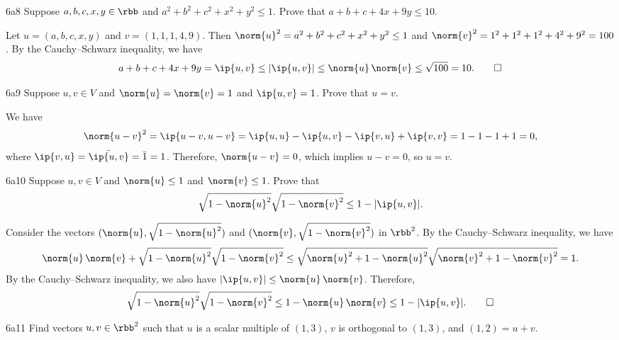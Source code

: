 \begin{exercise}{6a8}
    Suppose $a, b, c, x, y \in \rbb$ and $a^2 + b^2 + c^2 + x^2 + y^2 \leq 1$.
    Prove that $a + b + c + 4x + 9y \leq 10$.
\end{exercise}

\begin{sol}
    Let $u = (a, b, c, x, y)$ and $v = (1, 1, 1, 4, 9)$.
    Then $\norm{u}^2 = a^2 + b^2 + c^2 + x^2 + y^2 \leq 1$ and $\norm{v}^2 = 1^2 + 1^2 + 1^2 + 4^2 + 9^2 = 100$.
    By the Cauchy--Schwarz inequality, we have
    \[
        a + b + c + 4x + 9y = \ip{u, v} \leq |\ip{u, v}| \leq \norm{u}\,\norm{v} \leq \sqrt{100} = 10. \qedhere
    \]
\end{sol}

\begin{exercise}{6a9}
    Suppose $u, v \in V$ and $\norm{u} = \norm{v} = 1$ and $\ip{u, v} = 1$.
    Prove that $u = v$.
\end{exercise}

\begin{sol}
    We have
    \[
        \norm{u - v}^2 = \ip{u - v, u - v} = \ip{u, u} - \ip{u, v} - \ip{v, u} + \ip{v, v} = 1 - 1 - 1 + 1 = 0,
    \]
    where $\ip{v, u} = \bar{\ip{u, v}} = \bar 1 = 1$.
    Therefore, $\norm{u - v} = 0$, which implies $u - v = 0$, so $u = v$.
\end{sol}

\begin{exercise}{6a10}
    Suppose $u, v \in V$ and $\norm{u} \leq 1$ and $\norm{v} \leq 1$.
    Prove that
    \[
        \sqrt{1 - \norm{u}^2}\sqrt{1 - \norm{v}^2} \leq 1 - |\ip{u, v}|.
    \]
\end{exercise}

\begin{sol}
    Consider the vectors $(\norm{u}, \sqrt{1 - \norm{u}^2})$ and $(\norm{v}, \sqrt{1 - \norm{v}^2})$ in $\rbb^2$.
    By the Cauchy--Schwarz inequality, we have
    \[
        \norm{u}\,\norm{v} + \sqrt{1 - \norm{u}^2}\sqrt{1 - \norm{v}^2} \leq \sqrt{\norm{u}^2 + 1 - \norm{u}^2}\sqrt{\norm{v}^2 + 1 - \norm{v}^2} = 1.
    \]
    By the Cauchy--Schwarz inequality, we also have $|\ip{u, v}| \leq \norm{u}\,\norm{v}$.
    Therefore,
    \[
        \sqrt{1 - \norm{u}^2}\sqrt{1 - \norm{v}^2} \leq 1 - \norm{u}\,\norm{v} \leq 1 - |\ip{u, v}|. \qedhere
    \]
\end{sol}

\begin{exercise}{6a11}
    Find vectors $u, v \in \rbb^2$ such that $u$ is a scalar multiple of $(1, 3)$, $v$ is orthogonal to $(1, 3)$, and $(1, 2) = u + v$.
\end{exercise}

